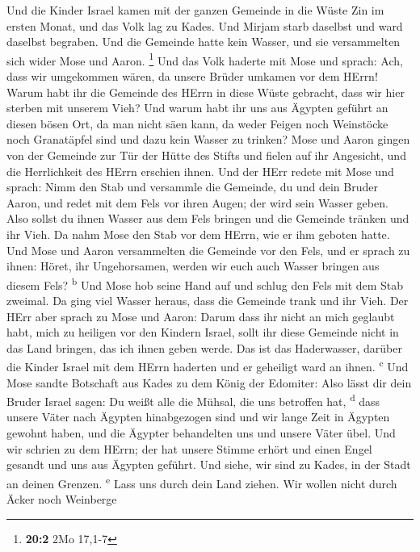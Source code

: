  Und die Kinder Israel kamen mit der ganzen Gemeinde in
die Wüste Zin im ersten Monat, und das Volk lag zu Kades. Und Mirjam
starb daselbst und ward daselbst begraben.  Und die
Gemeinde hatte kein Wasser, und sie versammelten sich wider Mose und
Aaron. \footnote{\textbf{20:2} 2Mo 17,1-7}  Und das Volk
haderte mit Mose und sprach: Ach, dass wir umgekommen wären, da unsere
Brüder umkamen vor dem HErrn!  Warum habt ihr die Gemeinde
des HErrn in diese Wüste gebracht, dass wir hier sterben mit unserem
Vieh?  Und warum habt ihr uns aus Ägypten geführt an
diesen bösen Ort, da man nicht säen kann, da weder Feigen noch
Weinstöcke noch Granatäpfel sind und dazu kein Wasser zu trinken?
 Mose und Aaron gingen von der Gemeinde zur Tür der Hütte
des Stifts und fielen auf ihr Angesicht, und die Herrlichkeit des HErrn
erschien ihnen.  Und der HErr redete mit Mose und sprach:
 Nimm den Stab und versammle die Gemeinde, du und dein
Bruder Aaron, und redet mit dem Fels vor ihren Augen; der wird sein
Wasser geben. Also sollst du ihnen Wasser aus dem Fels bringen und die
Gemeinde tränken und ihr Vieh.  Da nahm Mose den Stab vor
dem HErrn, wie er ihm geboten hatte.  Und Mose und Aaron
versammelten die Gemeinde vor den Fels, und er sprach zu ihnen: Höret,
ihr Ungehorsamen, werden wir euch auch Wasser bringen aus diesem Fels?
\textsuperscript{b}  Und Mose hob seine Hand auf und
schlug den Fels mit dem Stab zweimal. Da ging viel Wasser heraus, dass
die Gemeinde trank und ihr Vieh.  Der HErr aber sprach zu
Mose und Aaron: Darum dass ihr nicht an mich geglaubt habt, mich zu
heiligen vor den Kindern Israel, sollt ihr diese Gemeinde nicht in das
Land bringen, das ich ihnen geben werde.  Das ist das
Haderwasser, darüber die Kinder Israel mit dem HErrn haderten und er
geheiligt ward an ihnen. \textsuperscript{c}  Und Mose
sandte Botschaft aus Kades zu dem König der Edomiter: Also lässt dir
dein Bruder Israel sagen: Du weißt alle die Mühsal, die uns betroffen
hat, \textsuperscript{d}  dass unsere Väter nach Ägypten
hinabgezogen sind und wir lange Zeit in Ägypten gewohnt haben, und die
Ägypter behandelten uns und unsere Väter übel.  Und wir
schrien zu dem HErrn; der hat unsere Stimme erhört und einen Engel
gesandt und uns aus Ägypten geführt. Und siehe, wir sind zu Kades, in
der Stadt an deinen Grenzen. \textsuperscript{e}  Lass
uns durch dein Land ziehen. Wir wollen nicht durch Äcker noch Weinberge
